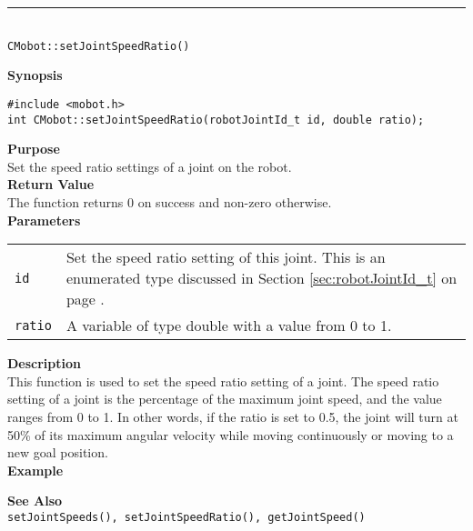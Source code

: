 \noindent
\vspace{5pt}
\rule{4.5in}{0.015in}\\
\noindent
{\LARGE \texttt{CMobot::setJointSpeedRatio()}}\\
{}

\noindent
{\bf Synopsis}
\vspace{-8pt}
\begin{verbatim}
#include <mobot.h>
int CMobot::setJointSpeedRatio(robotJointId_t id, double ratio);
\end{verbatim}

\noindent
{\bf Purpose}\\
Set the speed ratio settings of a joint on the robot.\\

\noindent
{\bf Return Value}\\
The function returns 0 on success and non-zero otherwise.\\

\noindent
{\bf Parameters}
\vspace{-0.1in}
\begin{description}
\item               
\begin{tabular}{p{10 mm}p{145 mm}}
\texttt{id} & Set the speed ratio setting of this joint. This is an 
enumerated type discussed in Section \ref{sec:robotJointId_t} on page
\pageref{sec:robotJointId_t}.\\
\texttt{ratio} & A variable of type double with a value from 0 to 1. 
\end{tabular}
\end{description}

\noindent
{\bf Description}\\
This function is used to set the speed ratio setting of a joint. The speed
ratio setting of a joint is the percentage of the maximum joint speed, and the
value ranges from 0 to 1. In other words, if the ratio is set to 0.5, the joint 
will turn at 50\% of its maximum angular velocity while moving continuously
or moving to a new goal position.\\

\noindent
{\bf Example}\\
\noindent

\noindent
{\bf See Also}\\
\texttt{setJointSpeeds(), setJointSpeedRatio(), getJointSpeed()}

